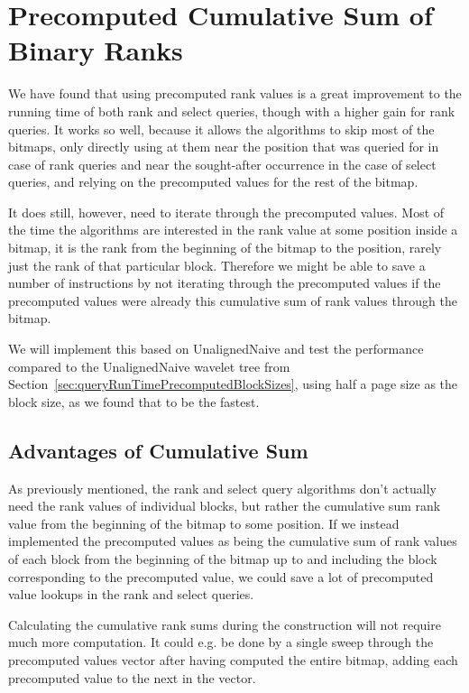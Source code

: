 \section{Precomputed Cumulative Sum of Binary Ranks}
We have found that using precomputed rank values is a great improvement to the running time of both rank and select queries, though with a higher gain for rank queries.
It works so well, because it allows the algorithms to skip most of the bitmaps, only directly using at them near the position that was queried for in case of rank queries and near the sought-after occurrence in the case of select queries, and relying on the precomputed values for the rest of the bitmap.

It does still, however, need to iterate through the precomputed values.
Most of the time the algorithms are interested in the rank value at some position inside a bitmap, it is the rank from the beginning of the bitmap to the position, rarely just the rank of that particular block.
Therefore we might be able to save a number of instructions by not iterating through the precomputed values if the precomputed values were already this cumulative sum of rank values through the bitmap.

We will implement this based on UnalignedNaive and test the performance compared to the UnalignedNaive wavelet tree from Section~\ref{sec:queryRunTimePrecomputedBlockSizes}, using half a page size as the block size, as we found that to be the fastest.

\subsection{Advantages of Cumulative Sum}
As previously mentioned, the rank and select query algorithms don't actually need the rank values of individual blocks, but rather the cumulative sum rank value from the beginning of the bitmap to some position.
If we instead implemented the precomputed values as being the cumulative sum of rank values of each block from the beginning of the bitmap up to and including the block corresponding to the precomputed value, we could save a lot of precomputed value lookups in the rank and select queries.

Calculating the cumulative rank sums during the construction will not require much more computation.
It could e.g. be done by a single sweep through the precomputed values vector after having computed the entire bitmap, adding each precomputed value to the next in the vector.

